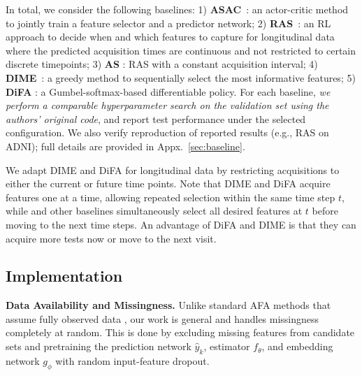 In total, we consider the following baselines: 1) \textbf{ASAC}~\citep{yoon2019asac}: an actor-critic method to jointly train a feature selector and a predictor network; 2) \textbf{RAS}~\citep{qin2024risk}: an RL approach to decide when and which features to capture for longitudinal data where the predicted acquisition times are continuous and not restricted to certain discrete timepoints; 3) \textbf{AS} \citep{qin2024risk}: RAS with a constant acquisition interval; 4) \textbf{DIME}~\citep{gadgil2023estimating}: a greedy method to sequentially select the most informative features; 5) \textbf{DiFA} \citep{ghosh2023difa}: a Gumbel-softmax-based differentiable policy. For each baseline, \emph{we perform a comparable hyperparameter search on the validation set using the authors' original code}, and report test performance under the selected configuration. We also verify reproduction of reported results (e.g., RAS on ADNI); full details are provided in Appx.~\ref{sec:baseline}.


We adapt DIME and DiFA for longitudinal data by restricting acquisitions to either the current or future time points. Note that DIME and DiFA acquire features one at a time, allowing repeated selection within the same time step $t$, while \texttt{\OurMethod} and other baselines simultaneously select all desired features at $t$ before moving to the next time steps. An advantage of DiFA and DIME is that they can acquire more tests now or move to the next visit. 


\subsection{Implementation}
\label{sec:implementation}

\textbf{Data Availability and Missingness.} Unlike standard AFA methods that assume fully observed data \citep{rahbar2025survey, shim2018joint, nan2015feature}, our work is general and handles missingness completely at random. This is done by excluding missing features from candidate sets and pretraining the prediction network $\hat{y}_k$, estimator $f_\theta$, and embedding network $g_\phi$ with random input-feature dropout.  


